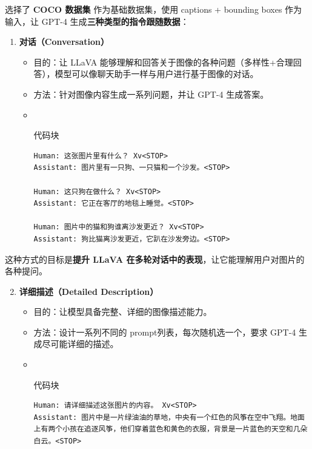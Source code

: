\documentclass[zihao=false,fontset=windows]{ctexart}
\newcommand{\feiEmoji}[1]{{\emojifont #1}}
\newcommand{\codehead}{{\small\ttfamily\color{feishuGray}代码块}\par\vspace{-0.15em}}
\begin{document}
选择了 \textbf{COCO 数据集} 作为基础数据集，使用 captions + bounding boxes 作为输入，让 GPT-4 生成\textcolor{feishuRed}{\textbf{三种类型的指令跟随数据}}：\par
\begin{enumerate}
\item \textbf{对话（Conversation）}
\begin{itemize}
\item 目的：让 LLaVA 能够理解和回答关于图像的各种问题（多样性+合理回答），模型可以像聊天助手一样与用户进行基于图像的对话。
\item 方法：针对图像内容生成一系列问题，并让 GPT-4 生成答案。
\item {\feiEmoji{🌰}}
\begin{feishucode}
\codehead
\begin{lstlisting}
Human: 这张图片里有什么？ Xv<STOP>
Assistant: 图片里有一只狗、一只猫和一个沙发。<STOP>

Human: 这只狗在做什么？ Xv<STOP>
Assistant: 它正在客厅的地毯上睡觉。<STOP>

Human: 图片中的猫和狗谁离沙发更近？ Xv<STOP>
Assistant: 狗比猫离沙发更近，它趴在沙发旁边。<STOP>
\end{lstlisting}
\end{feishucode}
\end{itemize}
\end{enumerate}

这种方式的目标是\textbf{提升 LLaVA 在多轮对话中的表现}，让它能理解用户对图片的各种提问。\par

\begin{enumerate}
\setcounter{enumi}{1}
\item \textbf{详细描述（Detailed Description）}
\begin{itemize}
\item 目的：让模型具备完整、详细的图像描述能力。
\item 方法：设计一系列不同的 prompt列表，每次随机选一个，要求 GPT-4 生成尽可能详细的描述。
\item {\feiEmoji{🌰}}
\begin{feishucode}
\codehead
\begin{lstlisting}
Human: 请详细描述这张图片的内容。 Xv<STOP>
Assistant: 图片中是一片绿油油的草地，中央有一个红色的风筝在空中飞翔。地面上有两个小孩在追逐风筝，他们穿着蓝色和黄色的衣服，背景是一片蓝色的天空和几朵白云。<STOP>
\end{lstlisting}
\end{feishucode}
\end{itemize}
\end{enumerate}
\end{document}
